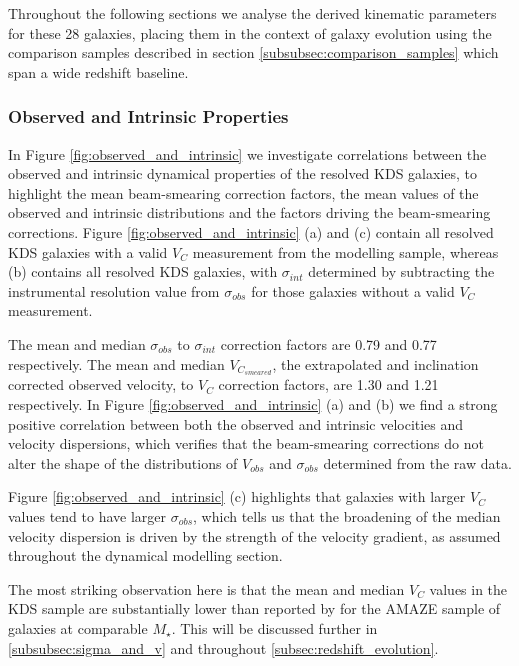 \documentclass[fleqn,usenatbib]{mn2e}
\begin{document}
Throughout the following sections we analyse the derived kinematic parameters for these 28 galaxies, placing them in the context of galaxy evolution using the comparison samples described in section \cref{subsubsec:comparison_samples} which span a wide redshift baseline.

\subsubsection{Observed and Intrinsic Properties}\label{subsubsec:observed_and_intrinsic}
In Figure \ref{fig:observed_and_intrinsic} we investigate correlations between the observed and intrinsic dynamical properties of the resolved KDS galaxies, to highlight the mean beam-smearing correction factors, the mean values of the observed and intrinsic distributions and the factors driving the beam-smearing corrections.
Figure \ref{fig:observed_and_intrinsic} (a) and (c) contain all resolved KDS galaxies with a valid $V_{C}$ measurement from the modelling sample, whereas (b) contains all resolved KDS galaxies, with $\sigma_{int}$ determined by subtracting the instrumental resolution value from $\sigma_{obs}$ for those galaxies without a valid $V_{C}$ measurement. 

The mean and median $\sigma_{obs}$ to $\sigma_{int}$ correction factors are 0.79 and 0.77 respectively. 
The mean and median $V_{C_{smeared}}$, the extrapolated and inclination corrected observed velocity, to $V_{C}$ correction factors, are 1.30 and 1.21 respectively.
In Figure \ref{fig:observed_and_intrinsic} (a) and (b) we find a strong positive correlation between both the observed and intrinsic velocities and velocity dispersions, which verifies that the beam-smearing corrections do not alter the shape of the distributions of $V_{obs}$ and $\sigma_{obs}$ determined from the raw data.

Figure \ref{fig:observed_and_intrinsic} (c) highlights that galaxies with larger $V_{C}$ values tend to have larger $\sigma_{obs}$, which tells us that the broadening of the median velocity dispersion is driven by the strength of the velocity gradient, as assumed throughout the dynamical modelling section.

The most striking observation here is that the mean and median $V_{C}$ values in the KDS sample are substantially lower than reported by \cite{Gnerucci2011} for the AMAZE sample of galaxies at comparable $M_{\star}$.
This will be discussed further in \cref{subsubsec:sigma_and_v} and throughout \cref{subsec:redshift_evolution}.
\end{document}
